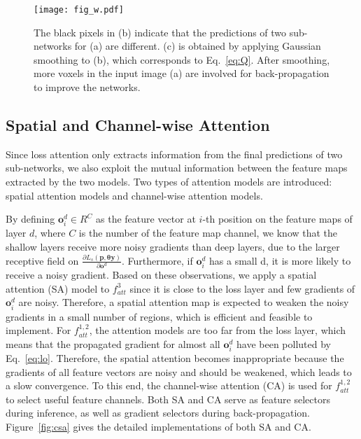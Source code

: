 \documentclass[letterpaper]{article} %
\begin{document}
\label{sec:sca}\begin{figure}[t]
	\begin{center}
		\texttt{[image: fig\_w.pdf]}
	\end{center}
	\caption{The black pixels in (b) indicate that the predictions of two sub-networks for (a) are different. (c) is obtained by applying Gaussian smoothing to (b), which corresponds to Eq.~\eqref{eq:Q}. After smoothing, more voxels in the input image (a) are involved for back-propagation to improve the networks. }
	\label{fig:w}
\end{figure}\subsection{Spatial and Channel-wise Attention}
Since loss attention only extracts information from the final predictions of two sub-networks, we also exploit the mutual information between the feature maps extracted by the two models. Two types of attention models are introduced: spatial attention models and channel-wise attention models.


By defining $\boldsymbol{o}_{i}^d\in R^{C}$ as the feature vector at $i$-th position on the feature maps of layer $d$, where $C$ is the number of the feature map channel, we know  that the shallow layers receive more noisy gradients than deep layers, due to the larger receptive field on $\frac{\partial L_s(\boldsymbol{p},\bm{\theta} \boldsymbol{y})}{\partial \boldsymbol{o}^d}$. Furthermore, if $\boldsymbol{o}_{i}^d$ has a small d, it is more likely to receive a noisy gradient.
Based on these observations, we apply a spatial attention (SA) model to $f^{3}_{att}$ since it is close to the loss layer and few gradients of $\boldsymbol{o}_{i}^d$ are noisy.
Therefore, a spatial attention map is expected to weaken the noisy gradients in a small number of regions, which is efficient and feasible to implement.
For $f^{1,2}_{att}$, the attention models are too far from the loss layer, which means that the propagated gradient for almost all $\boldsymbol{o}_{i}^d$ have been polluted by Eq.~\eqref{eq:lo}.
Therefore, the spatial attention becomes inappropriate because the gradients of all feature vectors are noisy and should be weakened, which leads to a slow convergence.
To this end, the channel-wise attention (CA) is used for $f_{att}^{1,2}$ to select useful feature channels.
Both SA and CA serve as feature selectors during inference, as well as gradient selectors during back-propagation.
Figure~\ref{fig:csa} gives the detailed implementations of both SA and CA.
\end{document}
